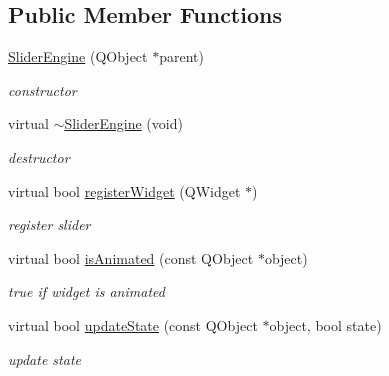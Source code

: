 \subsection*{Public Member Functions}
\begin{DoxyCompactItemize}
\item 
\mbox{\label{class_slider_engine_ad73fc511a47dad8174d3c4eb710ac22e}} 
\hyperlink{class_slider_engine_ad73fc511a47dad8174d3c4eb710ac22e}{Slider\+Engine} (Q\+Object $\ast$parent)
\begin{DoxyCompactList}\small\item\em constructor \end{DoxyCompactList}\item 
\mbox{\label{class_slider_engine_a260b7202add479a3bf69e50e817fb01e}} 
virtual \hyperlink{class_slider_engine_a260b7202add479a3bf69e50e817fb01e}{$\sim$\+Slider\+Engine} (void)
\begin{DoxyCompactList}\small\item\em destructor \end{DoxyCompactList}\item 
\mbox{\label{class_slider_engine_a13d170d546dee5d975b8efed7e3cf516}} 
virtual bool \hyperlink{class_slider_engine_a13d170d546dee5d975b8efed7e3cf516}{register\+Widget} (Q\+Widget $\ast$)
\begin{DoxyCompactList}\small\item\em register slider \end{DoxyCompactList}\item 
\mbox{\label{class_slider_engine_a3245ccd2ed2f11d2a886051c6c68ec98}} 
virtual bool \hyperlink{class_slider_engine_a3245ccd2ed2f11d2a886051c6c68ec98}{is\+Animated} (const Q\+Object $\ast$object)
\begin{DoxyCompactList}\small\item\em true if widget is animated \end{DoxyCompactList}\item 
\mbox{\label{class_slider_engine_a2f66d29c0f47a4b66a7802f063fc976d}} 
virtual bool \hyperlink{class_slider_engine_a2f66d29c0f47a4b66a7802f063fc976d}{update\+State} (const Q\+Object $\ast$object, bool state)
\begin{DoxyCompactList}\small\item\em update state \end{DoxyCompactList}\item 

\end{DoxyCompactItemize}

